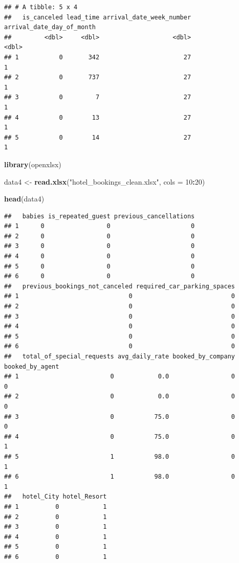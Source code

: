 \documentclass[
]{article}
\newenvironment{Shaded}{\begin{snugshade}}{\end{snugshade}}
\newcommand{\AttributeTok}[1]{\textcolor[rgb]{0.13,0.29,0.53}{#1}}
\newcommand{\DecValTok}[1]{\textcolor[rgb]{0.00,0.00,0.81}{#1}}
\newcommand{\FunctionTok}[1]{\textcolor[rgb]{0.13,0.29,0.53}{\textbf{#1}}}
\newcommand{\NormalTok}[1]{#1}
\newcommand{\OtherTok}[1]{\textcolor[rgb]{0.56,0.35,0.01}{#1}}
\newcommand{\SpecialCharTok}[1]{\textcolor[rgb]{0.81,0.36,0.00}{\textbf{#1}}}
\newcommand{\StringTok}[1]{\textcolor[rgb]{0.31,0.60,0.02}{#1}}
\begin{document}
\begin{verbatim}
## # A tibble: 5 x 4
##   is_canceled lead_time arrival_date_week_number arrival_date_day_of_month
##         <dbl>     <dbl>                    <dbl>                     <dbl>
## 1           0       342                       27                         1
## 2           0       737                       27                         1
## 3           0         7                       27                         1
## 4           0        13                       27                         1
## 5           0        14                       27                         1
\end{verbatim}

\begin{Shaded}
\begin{Highlighting}[]
\FunctionTok{library}\NormalTok{(openxlsx)}

\NormalTok{data4 }\OtherTok{\textless{}{-}} \FunctionTok{read.xlsx}\NormalTok{(}\StringTok{"hotel\_bookings\_clean.xlsx"}\NormalTok{, }\AttributeTok{cols =} \DecValTok{10}\SpecialCharTok{:}\DecValTok{20}\NormalTok{)}

\FunctionTok{head}\NormalTok{(data4)}
\end{Highlighting}
\end{Shaded}

\begin{verbatim}
##   babies is_repeated_guest previous_cancellations
## 1      0                 0                      0
## 2      0                 0                      0
## 3      0                 0                      0
## 4      0                 0                      0
## 5      0                 0                      0
## 6      0                 0                      0
##   previous_bookings_not_canceled required_car_parking_spaces
## 1                              0                           0
## 2                              0                           0
## 3                              0                           0
## 4                              0                           0
## 5                              0                           0
## 6                              0                           0
##   total_of_special_requests avg_daily_rate booked_by_company booked_by_agent
## 1                         0            0.0                 0               0
## 2                         0            0.0                 0               0
## 3                         0           75.0                 0               0
## 4                         0           75.0                 0               1
## 5                         1           98.0                 0               1
## 6                         1           98.0                 0               1
##   hotel_City hotel_Resort
## 1          0            1
## 2          0            1
## 3          0            1
## 4          0            1
## 5          0            1
## 6          0            1
\end{verbatim}
\end{document}

